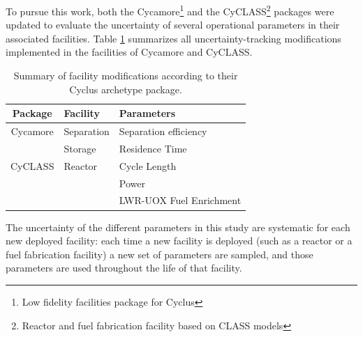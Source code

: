 \documentclass{anstrans}
\begin{document}
To pursue this work, both the Cycamore\footnote{Low
fidelity facilities package for Cyclus}\cite{cycamore} and the
CyCLASS\footnote{Reactor and fuel fabrication facility based on CLASS\cite{CLASS} models}\cite{mouginot_2018, cyclass} packages were
updated to evaluate the uncertainty of several
operational parameters in their associated facilities.  Table
\ref{tab:package_uncertainty} summarizes all uncertainty-tracking modifications implemented in the
facilities of Cycamore and CyCLASS.

\begin{table}[htb]
\centering
  \caption{Summary of facility modifications according to their Cyclus archetype package.}
\begin{tabular}{cl|l}
\toprule

Package   & Facility   & Parameters                \\
\toprule

Cycamore & Separation & Separation efficiency     \\\cmidrule{2-3} 
         & Storage    & Residence Time            \\
\toprule
CyCLASS  & Reactor    & Cycle Length              \\\cmidrule{3-3}
         &            & Power                     \\\cmidrule{3-3}
         &            & \acrshort{LWR}-\acrshort{UOX} Fuel Enrichment\\

\bottomrule
\end{tabular}

  \label{tab:package_uncertainty}
\end{table}

The uncertainty of the different parameters in this study
are systematic for each new deployed facility: each time a new facility is
deployed (such as a reactor or a fuel fabrication facility) a new set of
parameters are sampled, and those parameters are used throughout the life
of that facility.
\end{document}
